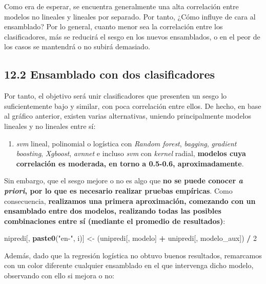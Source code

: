 \documentclass[
]{article}
\newenvironment{Shaded}{\begin{snugshade}}{\end{snugshade}}
\newcommand{\DecValTok}[1]{\textcolor[rgb]{0.00,0.00,0.81}{#1}}
\newcommand{\KeywordTok}[1]{\textcolor[rgb]{0.13,0.29,0.53}{\textbf{#1}}}
\newcommand{\NormalTok}[1]{#1}
\newcommand{\OperatorTok}[1]{\textcolor[rgb]{0.81,0.36,0.00}{\textbf{#1}}}
\newcommand{\StringTok}[1]{\textcolor[rgb]{0.31,0.60,0.02}{#1}}
\providecommand{\tightlist}{%
  \setlength{\itemsep}{0pt}\setlength{\parskip}{0pt}}
\begin{document}
Como era de esperar, se encuentra generalmente una alta correlación
entre modelos no lineales y lineales por separado. Por tanto, ¿Cómo
influye de cara al ensamblado? Por lo general, cuanto menor sea la
correlación entre los clasificadores, más se reducirá el sesgo en los
nuevos ensamblados, o en el peor de los casos se mantendrá o no subirá
demasiado.

\hypertarget{ensamblado-con-dos-clasificadores}{%
\subsection{12.2 Ensamblado con dos
clasificadores}\label{ensamblado-con-dos-clasificadores}}

Por tanto, el objetivo será unir clasificadores que presenten un sesgo
lo suficientemente bajo y similar, con poca correlación entre ellos. De
hecho, en base al gráfico anterior, existen varias alternativas, uniendo
principalmente modelos lineales y no lineales entre sí:

\begin{enumerate}
\def\labelenumi{\arabic{enumi}.}
\tightlist
\item
  \emph{svm} lineal, polinomial o logística con \emph{Random forest},
  \emph{bagging}, \emph{gradient boosting}, \emph{Xgboost},
  \emph{avnnet} e incluso \emph{svm} con \emph{kernel} radial,
  \textbf{modelos cuya correlación es moderada, en torno a 0.5-0.6,
  aproximadamente}.
\end{enumerate}

Sin embargo, que el sesgo mejore o no es algo que \textbf{no se puede
conocer \emph{a priori}, por lo que es necesario realizar pruebas
empíricas}. Como consecuencia, \textbf{realizamos una primera
aproximación, comezando con un ensamblado entre dos modelos, realizando
todas las posibles combinaciones entre sí (mediante el promedio de
resultados)}:

\begin{Shaded}
\begin{Highlighting}[]
\NormalTok{nipredi[, }\KeywordTok{paste0}\NormalTok{(}\StringTok{"en{-}"}\NormalTok{, i)] <{-}}\StringTok{ }\NormalTok{(unipredi[, modelo] }\OperatorTok{+}\StringTok{ }\NormalTok{unipredi[, modelo\_aux]) }\OperatorTok{/}\StringTok{ }\DecValTok{2}
\end{Highlighting}
\end{Shaded}

Además, dado que la regresión logística no obtuvo buenos resultados,
remarcamos con un color diferente cualquier ensamblado en el que
intervenga dicho modelo, observando con ello si mejora o no:
\end{document}
